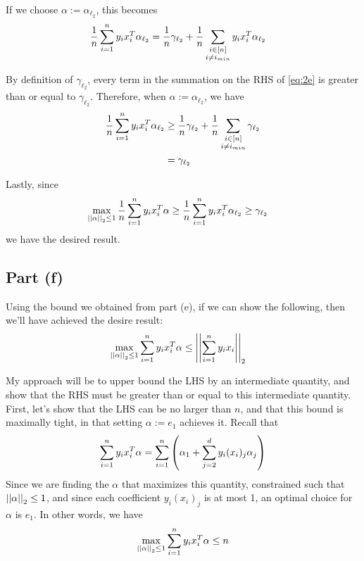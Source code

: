 \documentclass[11pt]{article}
\newcommand{\1}{\mathbb{I}} %
\begin{document}
If we choose $\alpha := \alpha_{\ell_2}$, this becomes 
\begin{align}
	\frac{1}{n} \sum_{i=1}^{n} y_i x_i^T \alpha_{\ell_2}
	&= \frac{1}{n} \gamma_{\ell_2} + \frac{1}{n} \sum_{\substack{i \in [n] \\ i \neq i_{min}}} y_i x_i^T \alpha_{\ell_2} \label{eq:2e}
\end{align}

By definition of $\gamma_{\ell_2}$, every term in the summation on the RHS of \ref{eq:2e} is greater than or equal to $\gamma_{\ell_2}$. Therefore, when $\alpha := \alpha_{\ell_2}$, we have 
\begin{align}
	\frac{1}{n} \sum_{i=1}^{n} y_i x_i^T \alpha_{\ell_2}
	&\geq \frac{1}{n} \gamma_{\ell_2} + \frac{1}{n} \sum_{\substack{i \in [n] \\ i \neq i_{min}}} \gamma_{\ell_2} \\
	&= \gamma_{\ell_2}
\end{align}

Lastly, since  
\begin{align}
\max_{\left|\left| \alpha \right|\right|_{2} \leq 1} \frac{1}{n} \sum_{i=1}^{n} y_i x_i^T \alpha
	&\geq \frac{1}{n} \sum_{i=1}^{n} y_i x_i^T \alpha_{\ell_2} 
	\geq \gamma_{\ell_2}
\end{align}
we have the desired result.

\myspace
{}
\subsection*{Part (f)}

Using the bound we obtained from part (e), if we can show the following, then we'll have achieved the desire result:
\begin{align}
 \max_{\left|\left| \alpha \right|\right|_{2} \leq 1} \sum_{i=1}^{n} y_i x_i^T\alpha 
 	&\leq \left|\left| \sum_{i=1}^{n} y_i x_i \right|\right|_{2}
\end{align}

My approach will be to upper bound the LHS by an intermediate quantity, and show that the RHS must be greater than or equal to this intermediate quantity. \\

First, let's show that the LHS can be no larger than $n$, and that this bound is maximally tight, in that setting $\alpha := e_1$ achieves it. Recall that
\begin{align}
	\sum_{i=1}^{n} y_i x_i^T\alpha = \sum_{i=1}^{n} \left(  \alpha_1 + \sum_{j = 2}^{d} y_i (x_i)_j \alpha_j  \right)
\end{align}
Since we are finding the $\alpha$ that maximizes this quantity, constrained such that $\left|\left| \alpha \right|\right|_{2} \leq 1$, and since each coefficient $ y_i (x_i)_j $ is at most 1, an optimal choice for $\alpha$ is $e_1$. In other words, we have 
\begin{align}
	\max_{\left|\left| \alpha \right|\right|_{2} \leq 1} \sum_{i=1}^{n} y_i x_i^T \alpha \leq n \label{eq:2f-lhs}
\end{align}
\end{document}
